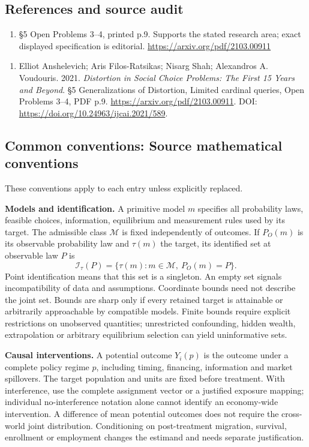 \documentclass[11pt,a4paper]{article}
\begin{document}
\subsection*{References and source audit}
\begin{enumerate}
\item §5 Open Problems 3–4, printed p.9. Supports the stated research area; exact displayed specification is editorial. \url{https://arxiv.org/pdf/2103.00911}
\end{enumerate}
\begin{enumerate}\raggedright
\item\hypertarget{definitions:source:30007561:1}{} Elliot Anshelevich; Aris Filos-Ratsikas; Nisarg Shah; Alexandros A. Voudouris. 2021. \emph{Distortion in Social Choice Problems: The First 15 Years and Beyond}. §5 Generalizations of Distortion, Limited cardinal queries, Open Problems 3–4, PDF p.9.
\url{https://arxiv.org/pdf/2103.00911}.
DOI: \url{https://doi.org/10.24963/ijcai.2021/589}.
\end{enumerate}

\subsection*{Common conventions: Source mathematical conventions}

These conventions apply to each entry unless explicitly replaced.

\textbf{Models and identification.} A primitive model \(m\) specifies all probability laws, feasible choices, information, equilibrium and measurement rules used by its target. The admissible class \(\mathcal M\) is fixed independently of outcomes. If \(P_O(m)\) is its observable probability law and \(\tau(m)\) the target, its identified set at observable law \(P\) is
\[
 \mathcal I_\tau(P)=\{\tau(m):m\in\mathcal M,\ P_O(m)=P\}.
\]
Point identification means that this set is a singleton. An empty set signals incompatibility of data and assumptions. Coordinate bounds need not describe the joint set. Bounds are sharp only if every retained target is attainable or arbitrarily approachable by compatible models. Finite bounds require explicit restrictions on unobserved quantities; unrestricted confounding, hidden wealth, extrapolation or arbitrary equilibrium selection can yield uninformative sets.

\textbf{Causal interventions.} A potential outcome \(Y_i(p)\) is the outcome under a complete policy regime \(p\), including timing, financing, information and market spillovers. The target population and units are fixed before treatment. With interference, use the complete assignment vector or a justified exposure mapping; individual no-interference notation alone cannot identify an economy-wide intervention. A difference of mean potential outcomes does not require the cross-world joint distribution. Conditioning on post-treatment migration, survival, enrollment or employment changes the estimand and needs separate justification.
\end{document}
